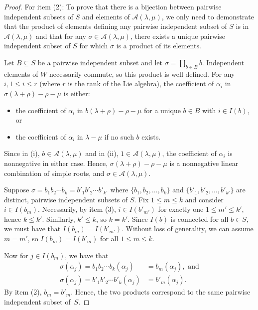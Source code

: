 \documentclass{amsart}
\theoremstyle{definition}
\newcommand{\calA}{\mathcal{A}}
\begin{document}
\begin{proof}
    For item (2): To prove that there is a bijection between pairwise independent subsets of $S$ and elements of $\calA(\lambda,\mu)$, we only need to demonstrate that the product of elements defining any pairwise independent subset of $S$ is in $\calA(\lambda,\mu)$ and that for any $\sigma\in \calA(\lambda,\mu)$, there exists a unique pairwise independent subset of $S$ for which $\sigma$ is a product of its elements.

    Let $B\subseteq S$ be a pairwise independent subset and let $\sigma=\prod_{b\in B}b$. Independent elements of $W$ necessarily commute, so this product is well-defined. For any $i, 1 \le i \le r$ (where $r$ is the rank of the Lie algebra), 
    the coefficient of $\alpha_i$ in $\sigma(\lambda+\rho)-\rho-\mu$
    is either: \begin{itemize}
        \item[(i)] the coefficient of $\alpha_i$ in
        $b(\lambda+\rho)-\rho-\mu$ for a unique $b\in B$ with $i\in I(b)$, or
        \item[(ii)] the coefficient of $\alpha_i$ in $\lambda-\mu$ if no such $b$ exists.
    \end{itemize}
    Since in (i), $b\in \calA(\lambda,\mu)$ and in (ii), $1\in \calA(\lambda,\mu)$, the coefficient of $\alpha_i$
    is nonnegative in either case. Hence, 
    $\sigma(\lambda+\rho)-\rho-\mu$ is a nonnegative linear combination of simple roots, and $\sigma\in \calA(\lambda,\mu)$.

    Suppose $\sigma=b_1b_2\cdots b_k=b'_1b'_2\cdots b'_{k'}$ where $\{b_1,b_2,\hdots,b_k\}$ and $\{b'_1,b'_2,\hdots,b'_{k'}\}$ are distinct, pairwise independent subsets of $S$. Fix $1\leq m\leq k$ and consider $i\in I(b_m)$. Necessarily, by  item (3), $i\in I(b'_{m'})$ for exactly one $1\leq m'\leq k'$, hence $k\le k'$. Similarly, $k'\le k$, so $k=k'$. Since $I(b)$ is connected for all $b\in S$, we must have that $I(b_m)=I(b'_{m'})$. Without loss of generality, we can assume $m=m'$, so $I(b_m)=I(b'_m)$ for all $1\leq m\leq k$.
    
    Now for $j\in I(b_m)$, we have that \begin{align*}
        \sigma(\alpha_j)=b_1b_2\cdots b_k(\alpha_j)&=b_m(\alpha_j), \mbox{ and}\\
        \sigma(\alpha_j)=b'_1b'_2\cdots b'_{k}(\alpha_j)&=b'_m(\alpha_j).
    \end{align*}
    By  item (2), $b_m=b'_m$. 
    Hence, the two products correspond to the same pairwise independent subset of~$S$.
\end{proof}
\end{document}
